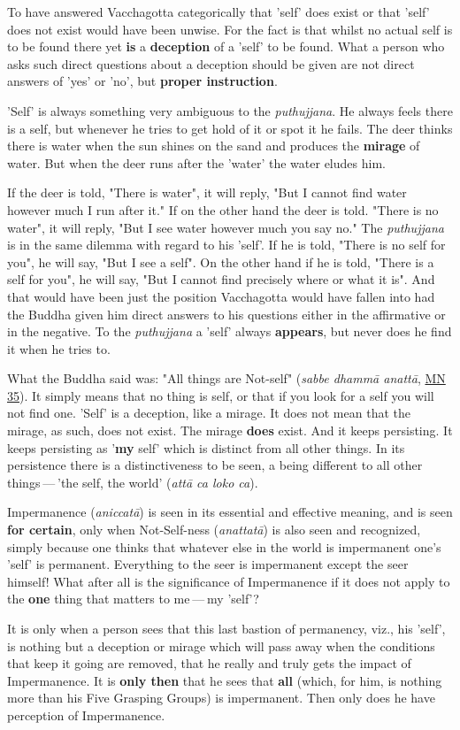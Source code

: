 To have answered Vacchagotta categorically that 'self' does exist or
that 'self' does not exist would have been unwise. For the fact is that
whilst no actual self is to be found there yet \textbf{is} a \textbf{deception} of a
'self' to be found. What a person who asks such direct questions about a
deception should be given are not direct answers of 'yes' or 'no', but
\textbf{proper instruction}.


'Self' is always something very ambiguous to the \emph{puthujjana}. He
always feels there is a self, but whenever he tries to get hold of it or
spot it he fails. The deer thinks there is water when the sun shines on
the sand and produces the \textbf{mirage} of water. But when the deer runs
after the 'water' the water eludes him.


If the deer is told, "There is
water", it will reply, "But I cannot find water however much I run after
it." If on the other hand the deer is told. "There is no water", it will
reply, "But I see water however much you say no." The \emph{puthujjana} is in
the same dilemma with regard to his 'self'. If he is told, "There is no
self for you", he will say, "But I see a self". On the other hand if he
is told, "There is a self for you", he will say, "But I cannot find
precisely where or what it is". And that would have been just the
position Vacchagotta would have fallen into had the Buddha given him
direct answers to his questions either in the affirmative or in the
negative. To the \emph{puthujjana} a 'self' always \textbf{appears}, but never
does he find it when he tries to.


What the Buddha said was: "All things are Not-self" (\emph{sabbe dhammā
anattā}, \href{https://suttacentral.net/mn35/en/sujato}{MN 35}). It simply means that no thing
is self, or that if you look for a self you will not find one. 'Self' is
a deception, like a mirage. It does not mean that the mirage, as such,
does not exist. The mirage \textbf{does} exist. And it keeps persisting. It
keeps persisting as '\textbf{my} self' which is distinct from all other
things. In its persistence there is a distinctiveness to be seen, a
being different to all other things — 'the self, the world' (\emph{attā ca
loko ca}).


Impermanence (\emph{aniccatā}) is seen in its essential and effective
meaning, and is seen \textbf{for certain}, only when Not-Self-ness
(\emph{anattatā}) is also seen and recognized, simply because one thinks
that whatever else in the world is impermanent one’s 'self' is
permanent. Everything to the seer is impermanent except the seer
himself! What after all is the significance of Impermanence if it does
not apply to the \textbf{one} thing that matters to me — my 'self'?


It is only when a person sees that this last bastion of permanency,
viz., his 'self', is nothing but a deception or mirage which will pass
away when the conditions that keep it going are removed, that he really
and truly gets the impact of Impermanence. It is \textbf{only then} that he
sees that \textbf{all} (which, for him, is nothing more than his Five Grasping
Groups) is impermanent. Then only does he have perception of
Impermanence.


